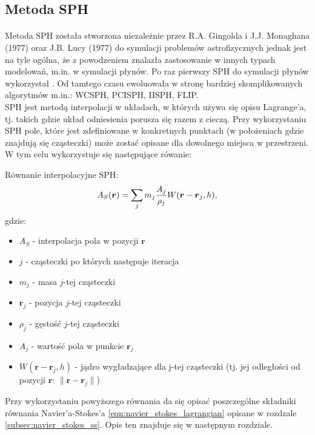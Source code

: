 \subsection{Metoda SPH}
\paragraph{}
Metoda SPH została stworzona niezależnie przez R.A. Gingolda i J.J. Monaghana (1977) oraz J.B. Lucy (1977) do symulacji problemów astrofizycznych jednak jest na tyle ogólna, że z powodzeniem znalazła zastosowanie w innych typach modelowań, m.in. w symulacji płynów. Po raz pierwszy SPH do symulacji płynów wykorzystał \cite{muller03}. Od tamtego czasu ewoluowała w stronę bardziej skomplikowanych algorytmów m.in.: WCSPH, PCISPH, IISPH, FLIP.\\
SPH jest metodą interpolacji w układach, w których używa się opisu Lagrange'a, tj. takich gdzie układ odniesienia porusza się razem z cieczą. Przy wykorzystaniu SPH pole, które jest zdefiniowane w konkretnych punktach (w położeniach gdzie znajdują się cząsteczki) może zostać opisane dla dowolnego miejsca w przestrzeni. W tym celu wykorzystuje się następujące rówanie:\\

\begin{samepage}
{\sc Równanie interpolacyjne SPH: }
\begin{equation}
A_S(\boldsymbol{r}) = \sum\limits_{j} m_j {A_j \over\rho_j}W(\boldsymbol{r}-\boldsymbol{r}_j, h),
\label{eqn:sph}
\end{equation}
gdzie:

\begin{itemize}[noitemsep,topsep=0pt,parsep=0pt,partopsep=0pt]
\renewcommand\labelitemi{--}
\item $ A_S $ - interpolacja pola w pozycji $\boldsymbol{r}$
\item $j$ - cząsteczki po których następuje iteracja
\item $m_j$ - masa $j$-tej cząsteczki
\item $\boldsymbol{r}_j$ - pozycja $j$-tej cząsteczki
\item $\rho_j$ - gęstość $j$-tej cząsteczki
\item $A_j$ - wartość pola w punkcie $\boldsymbol{r}_j$
\item $W(\boldsymbol{r}-\boldsymbol{r}_j, h)$ - jądro wygładzające dla j-tej cząsteczki (tj. jej odległości od pozycji $\boldsymbol{r}$: $\| \boldsymbol{r}-\boldsymbol{r}_j \|$)
\end{itemize}
\end{samepage}
\vspace{3ex}
Przy wykorzystaniu powyższego równania da się opisać poszczególne składniki równania Navier'a-Stokes'a \eqref{eqn:navier_stokes_lagrangian} opisane w rozdzale \eqref{subsec:navier_stokes_ss}. Opis ten znajduje się w następnym rozdziale.
\par

